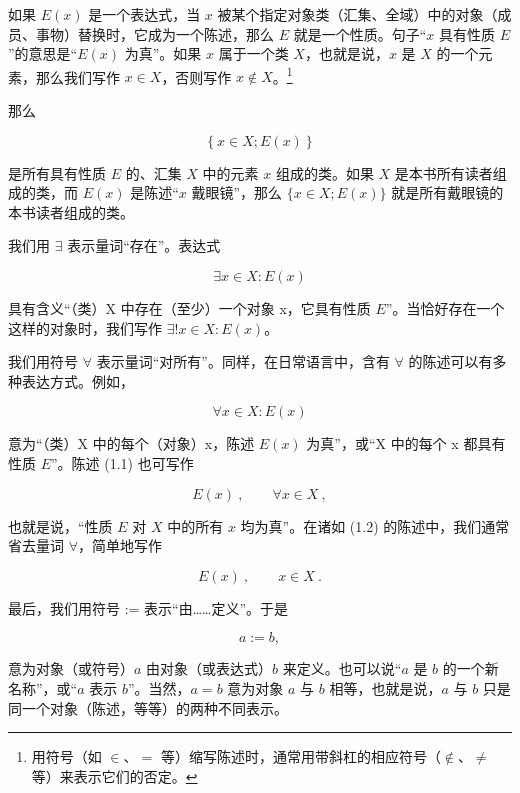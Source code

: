 如果 $E(x)$ 是一个表达式，当 $x$ 被某个指定对象类（汇集、全域）中的对象（成员、事物）替换时，它成为一个陈述，那么 $E$ 就是一个性质。句子“$x$ 具有性质 $E$”的意思是“$E(x)$ 为真”。如果 $x$ 属于一个类 $X$，也就是说，$x$ 是 $X$ 的一个元素，那么我们写作 $x \in X$，否则写作 $x \notin X$。\footnote{用符号（如 $\in$、$=$ 等）缩写陈述时，通常用带斜杠的相应符号（$\notin$、$\neq$ 等）来表示它们的否定。}

那么

\[
\left\{x\in X;E(x)\right\}
\]

是所有具有性质 $E$ 的、汇集 $X$ 中的元素 $x$ 组成的类。如果 $X$ 是本书所有读者组成的类，而 $E(x)$ 是陈述“$x$ 戴眼镜”，那么 $\{x \in X; E(x)\}$ 就是所有戴眼镜的本书读者组成的类。

我们用 $ \exists $ 表示量词“存在”。表达式

\[
\exists x\in X:E(x)
\]

具有含义“（类）X 中存在（至少）一个对象 x，它具有性质 $ E $”。当恰好存在一个这样的对象时，我们写作 $ \exists! x \in X : E(x) $。

我们用符号 $ \forall $ 表示量词“对所有”。同样，在日常语言中，含有 $ \forall $ 的陈述可以有多种表达方式。例如，

\begin{equation}
\forall x\in X\colon E(x)
\end{equation}

意为“（类）X 中的每个（对象）x，陈述 $ E(x) $ 为真”，或“X 中的每个 x 都具有性质 $ E $”。陈述 (1.1) 也可写作

\begin{equation}
E(x)~,\qquad\forall x\in X~,
\end{equation}

也就是说，“性质 $E$ 对 $X$ 中的所有 $x$ 均为真”。在诸如 (1.2) 的陈述中，我们通常省去量词 $\forall$，简单地写作

\begin{equation}
E(x)~,\qquad x\in X~.
\end{equation}

最后，我们用符号 := 表示“由……定义”。于是

\[
a:=b,
\]

意为对象（或符号）$a$ 由对象（或表达式）$b$ 来定义。也可以说“$a$ 是 $b$ 的一个新名称”，或“$a$ 表示 $b$”。当然，$a = b$ 意为对象 $a$ 与 $b$ 相等，也就是说，$a$ 与 $b$ 只是同一个对象（陈述，等等）的两种不同表示。

